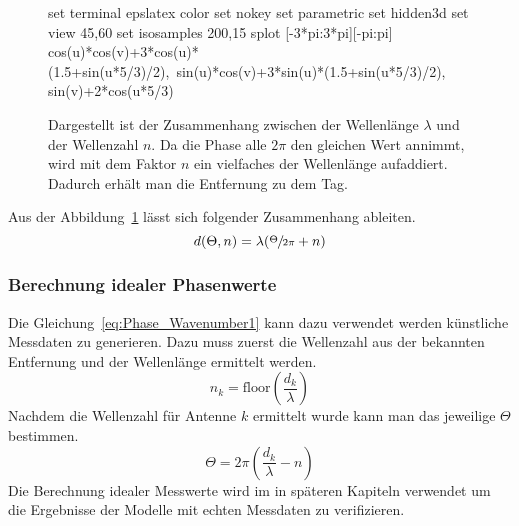 \begin{figure}[h!]
	\caption[Zusammenhang Wellenlänge - Wellenzahl]{Dargestellt ist der Zusammenhang zwischen der Wellenlänge $\lambda$ und der Wellenzahl $n$. Da die Phase alle $2\pi$ den gleichen Wert annimmt, wird mit dem Faktor $n$ ein vielfaches der Wellenlänge aufaddiert. Dadurch erhält man die Entfernung zu dem Tag.}
	\label{fig:wavenumber_wavelength}
	\begin{gnuplot} %
		set terminal epslatex color %
		set nokey %
		set parametric
		set hidden3d
		set view 45,60
		set isosamples 200,15
		splot [-3*pi:3*pi][-pi:pi] cos(u)*cos(v)+3*cos(u)*(1.5+sin(u*5/3)/2),\
		sin(u)*cos(v)+3*sin(u)*(1.5+sin(u*5/3)/2), sin(v)+2*cos(u*5/3)
	\end{gnuplot}	
%	
%	
\end{figure}


Aus der Abbildung~\ref{fig:wavenumber_wavelength} lässt sich folgender Zusammenhang ableiten.
%
\begin{equation}
	\label{eq:Phase_Wavenumber1}
	d(\Theta, n)=\lambda(\sfrac{\Theta}{2\pi}+n)
\end{equation}
%
\subsubsection{Berechnung idealer Phasenwerte}
\label{sec:PhaseCalculation}
%
Die Gleichung~\ref{eq:Phase_Wavenumber1} kann dazu verwendet werden künstliche Messdaten zu generieren. Dazu muss zuerst die Wellenzahl aus der bekannten Entfernung und der Wellenlänge ermittelt werden.
$$
n_k=\text{floor}(\frac{d_k}{\lambda})
$$
Nachdem die Wellenzahl für Antenne $k$ ermittelt wurde kann man das jeweilige $\Theta$ bestimmen.
$$
\Theta= 2\pi(\frac{d_k }{\lambda}-n)
$$
%
Die Berechnung idealer Messwerte wird im in späteren Kapiteln verwendet um die Ergebnisse der Modelle mit echten Messdaten zu verifizieren.